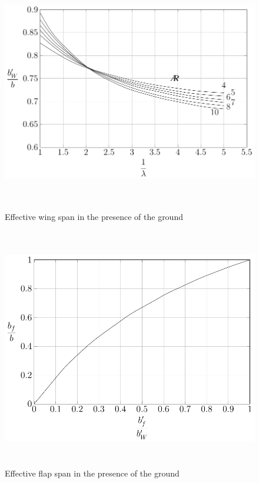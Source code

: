  \begin{figure}[H]
	\includegraphics[height=10.5cm, keepaspectratio ]{Immagini/Capitolo2/2_10-bapexwfracb} 
	\caption{Effective wing span in the presence of the ground} %
	\label{figura2_10} %
\end{figure}

\begin{figure}[H]
	\centering
	\includegraphics[height=10.5cm, keepaspectratio ]{Immagini/Capitolo2/2_11-bapexffracbapexw} 
	\caption{Effective flap span in the presence of the ground} %
	\label{fig:figura2_11} %
\end{figure}


